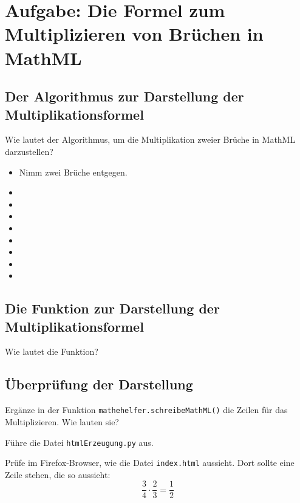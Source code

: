 \section{Aufgabe: Die Formel zum Multiplizieren von Brüchen in MathML}

\subsection*{Der Algorithmus zur Darstellung der Multiplikationsformel}

Wie lautet der Algorithmus, um die Multiplikation zweier Brüche in MathML darzustellen?

\begin{itemize}[itemsep=5ex]
	\item Nimm zwei Brüche entgegen.
	\item 
	\item 
	\item 
	\item 
	\item 
	\item 
	\item 
	\item 
\end{itemize}

\pagebreak

\subsection*{Die Funktion zur Darstellung der Multiplikationsformel}

Wie lautet die Funktion?

\subsection*{Überprüfung der Darstellung}

Ergänze in der Funktion \texttt{mathehelfer.schreibeMathML()} die Zeilen für das Multiplizieren. Wie lauten sie?

Führe die Datei \texttt{htmlErzeugung.py} aus.

Prüfe im Firefox-Browser, wie die Datei \texttt{index.html} aussieht. Dort sollte eine Zeile stehen, die so aussieht:
\[
\frac{3}{4} \cdot \frac{2}{3} = \frac{1}{2}
\]